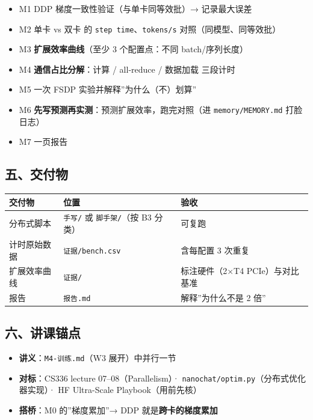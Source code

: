\documentclass[
  chinese,
  11pt,
]{ctexart}
\newcounter{none} %
\providecommand{\tightlist}{%
  \setlength{\itemsep}{0pt}\setlength{\parskip}{0pt}}
\begin{document}
\begin{itemize}
\tightlist
\item[$\square$]
  M1 DDP 梯度一致性验证（与单卡同等效批）→ 记录最大误差
\item[$\square$]
  M2 单卡 vs 双卡 的 \texttt{step\ time}、\texttt{tokens/s} 对照（同模型、同等效批）
\item[$\square$]
  M3 \textbf{扩展效率曲线}（至少 3 个配置点：不同 batch/序列长度）
\item[$\square$]
  M4 \textbf{通信占比分解}：计算 / all-reduce / 数据加载 三段计时
\item[$\square$]
  M5 一次 FSDP 实验并解释''为什么（不）划算''
\item[$\square$]
  M6 \textbf{先写预测再实测}：预测扩展效率，跑完对照（进 \texttt{memory/MEMORY.md} 打脸日志）
\item[$\square$]
  M7 一页报告
\end{itemize}

\subsection{五、交付物}\label{ux4e94ux4ea4ux4ed8ux7269-4}

{\def\LTcaptype{none} %
\begin{longtable}[]{@{}lll@{}}
\toprule\noalign{}
交付物 & 位置 & 验收 \\
\midrule\noalign{}
\endhead
\bottomrule\noalign{}
\endlastfoot
分布式脚本 & \texttt{手写/} 或 \texttt{脚手架/}（按 B3 分类） & 可复跑 \\
计时原始数据 & \texttt{证据/bench.csv} & 含每配置 3 次重复 \\
扩展效率曲线 & \texttt{证据/} & 标注硬件（2×T4 PCIe）与对比基准 \\
报告 & \texttt{报告.md} & 解释''为什么不是 2 倍'' \\
\end{longtable}
}

\subsection{六、讲课锚点}\label{ux516dux8bb2ux8bfeux951aux70b9-3}

\begin{itemize}
\tightlist
\item
  \textbf{讲义}：\texttt{M4-训练.md}（W3 展开）中并行一节
\item
  \textbf{对标}：CS336 lecture 07--08（Parallelism）· \texttt{nanochat/optim.py}（分布式优化器实现）· HF Ultra-Scale Playbook（用前先核）
\item
  \textbf{搭桥}：M0 的''梯度累加''→ DDP 就是\textbf{跨卡的梯度累加}
\end{itemize}
\end{document}
